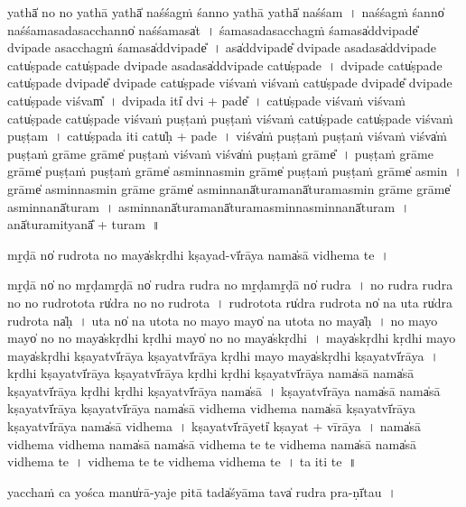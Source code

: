 \documentclass[parskip, DIV=14]{scrartcl}
\begin{document}
{yathā̍ no no॒ yathā॒ yathā̍ na॒śśagṁ śanno॒ yathā॒ yathā̍ na॒śśam~।
na॒śśagṁ śanno̍ na॒śśamasa॒dasa॒cchanno̍ na॒śśamasa̍t~।
śamasa॒dasa॒cchagṁ śamasa̍ddvi॒pade̎ dvi॒pade॒ asa॒cchagṁ śamasa̍ddvi॒pade̎~।
asa̍ddvi॒pade̎ dvi॒pade॒ asa॒dasa̍ddvi॒pade॒ catu̍ṣpade॒ catu̍ṣpade dvi॒pade॒ asa॒dasa̍ddvi॒pade॒ catu̍ṣpade~। %
dvi॒pade॒ catu̍ṣpade॒ catu̍ṣpade dvi॒pade̎ dvi॒pade॒ catu̍ṣpade॒ viśva॒ṁ viśva॒ṁ catu̍ṣpade dvi॒pade̎ dvi॒pade॒ catu̍ṣpade॒ viśvam̎~।
dvi॒pada॒ iti̍ dvi + pade̎~। 
catu̍ṣpade॒ viśva॒ṁ viśva॒ṁ catu̍ṣpade॒ catu̍ṣpade॒ viśvaṁ pu॒ṣṭaṁ pu॒ṣṭaṁ viśva॒ṁ catu̍ṣpade॒ catu̍ṣpade॒ viśvaṁ pu॒ṣṭam~। %
catu̍ṣpada॒ iti॒ catu̍ḥ + pa॒de॒~।
viśva̍ṁ pu॒ṣṭaṁ pu॒ṣṭaṁ viśva॒ṁ viśva̍ṁ pu॒ṣṭaṁ grāme॒ grāme̍ pu॒ṣṭaṁ viśva॒ṁ viśva̍ṁ pu॒ṣṭaṁ grāme̎~।
pu॒ṣṭaṁ grāme॒ grāme̍ pu॒ṣṭaṁ pu॒ṣṭaṁ grāme̍ a॒sminna॒smin grāme̍ pu॒ṣṭaṁ pu॒ṣṭaṁ grāme̍ a॒smin~।
grāme̍ a॒sminna॒smin grāme॒ grāme̍ a॒sminnanā̍tura॒manā̍turama॒smin grāme॒ grāme̍ a॒sminnanā̍turam~।
a॒sminnanā̍tura॒manā̍turama॒sminna॒sminnanā̍turam~।
anā̍tura॒mityanā̎ + tu॒ra॒m~॥ 

mṛ̱ḍā no̍ rudro॒ta no॒ maya̍skṛdhi kṣa॒yad-vī̍rāya॒ nama̍sā vidhema te~।

mṛ̱ḍā no̍ no mṛ̱ḍamṛ̱ḍā no̍ rudra rudra no mṛ̱ḍamṛ̱ḍā no̍ rudra~।
no॒ ru॒dra॒ ru॒dra॒ no॒ no॒ ru॒dro॒tota ru̍dra no no rudro॒ta~।
ru॒dro॒tota ru̍dra rudro॒ta no̍ na u॒ta ru̍dra rudro॒ta na̍ḥ~।
u॒ta no̍ na u॒tota no॒ mayo॒ mayo̍ na u॒tota no॒ maya̍ḥ~।
no॒ mayo॒ mayo̍ no no॒ maya̍skṛdhi kṛdhi॒ mayo̍ no no॒ maya̍skṛdhi~।
maya̍skṛdhi kṛdhi॒ mayo॒ maya̍skṛdhi kṣa॒yatvī̍rāya kṣa॒yatvī̍rāya kṛdhi॒ mayo॒ maya̍skṛdhi kṣa॒yatvī̍rāya~।
kṛ॒dhi॒ kṣa॒yatvī̍rāya kṣa॒yatvī̍rāya kṛdhi  kṛdhi kṣa॒yatvī̍rāya॒ nama̍sā॒ nama̍sā kṣa॒yatvī̍rāya kṛdhi  kṛdhi kṣa॒yatvī̍rāya॒ nama̍sā~।
kṣa॒yatvī̍rāya॒ nama̍sā॒ nama̍sā kṣa॒yatvī̍rāya kṣa॒yatvī̍rāya॒ nama̍sā vidhema vidhema॒ nama̍sā kṣa॒yatvī̍rāya kṣa॒yatvī̍rāya॒ nama̍sā vidhema~।
kṣa॒yatvī̍rā॒yeti̍ kṣa॒yat + vī॒rā॒ya॒~।
nama̍sā vidhema vidhema॒ nama̍sā॒ nama̍sā vidhema te te vidhema॒ nama̍sā॒ nama̍sā vidhema te~।
vi॒dhe॒ma॒ te॒ te॒ vi॒dhe॒ma॒ vi॒dhe॒ma॒ te॒~।
ta॒ iti te~॥ 


yacchaṁ ca॒ yośca॒ manu̍rā-ya॒je pi॒tā tada̍śyāma॒ tava̍ rudra॒ pra-ṇī̍tau~।

}
\end{document}
